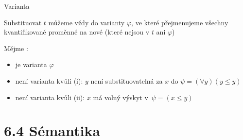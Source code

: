 \documentclass{beamer}
\begin{document}
\begin{frame}{Varianta}
    
    Substituovat $t$ můžeme vždy do \alert{varianty} $\varphi$, ve které přejmenujeme všechny kvantifikované proměnné na nové (které nejsou v $t$ ani $\varphi$)

    \smallskip
    

    \medskip

    Mějme :
    \begin{itemize}
        \item {} je varianta $\varphi$
        \item {} není varianta kvůli (i): $y$ není substituovatelná za $x$ do $\psi=(\forall y)(y\leq y)$
        \item {} není varianta kvůli (ii): $x$ má volný výskyt v~$\psi=(x\leq y)$        
    \end{itemize}   

\end{frame}


\section{6.4 Sémantika}
\end{document}

